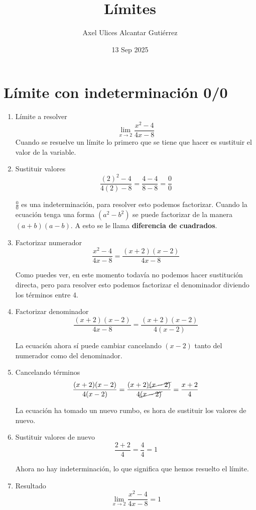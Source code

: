 \documentclass[a4paper,10pt]{article}
\title{Límites}
\author{Axel Ulices Alcantar Gutiérrez}
\date{13 Sep 2025}
\begin{document}
\maketitle

\section{Límite con indeterminación 0/0}

\begin{enumerate}
	\item Límite a resolver
	      $$\lim_{x\to2}\frac{x^{2} - 4}{4x - 8}$$
	      Cuando se resuelve un límite lo primero que se tiene que hacer es sustituir el valor de la variable.

	\item Sustituir valores
	      $$\frac{(2)^{2} - 4}{4(2) - 8} = \frac{4 - 4}{8 - 8} = \frac{0}{0}$$

	      $\frac{0}{0}$ es una indeterminación, para resolver esto podemos factorizar. Cuando la ecuación tenga una forma $(a^2 - b^2)$ se puede factorizar de la manera $(a + b)(a - b)$. A esto se le llama \textbf{diferencia de cuadrados}.

	\item Factorizar numerador
	      $$\frac{x^{2} - 4}{4x - 8} = \frac{(x + 2)(x - 2)}{4x - 8}$$

	      Como puedes ver, en este momento todavía no podemos hacer sustitución directa, pero para resolver esto podemos factorizar el denominador diviendo los términos entre 4.

	\item Factorizar denominador
	      $$\frac{(x + 2)(x - 2)}{4x - 8} = \frac{(x + 2)(x - 2)}{4(x - 2)}$$

	      La ecuación ahora sí puede cambiar cancelando $(x - 2)$ tanto del numerador como del denominador.

	\item Cancelando términos
	      $$\frac{(x + 2)(x - 2)}{4(x - 2)} = \frac{(x + 2)\cancel{(x - 2)}}{4\cancel{(x - 2)}} = \frac{x + 2}{4}$$

	      La ecuación ha tomado un nuevo rumbo, es hora de sustituir los valores de nuevo.

	\item Sustituir valores de nuevo
	      $$\frac{2 + 2}{4} = \frac{4}{4} = 1$$

	      Ahora no hay indeterminación, lo que significa que hemos resuelto el límite.

	\item Resultado
	      $$\boxed{\lim_{x\to2}\frac{x^{2} - 4}{4x - 8} = 1}$$

\end{enumerate}
\end{document}
